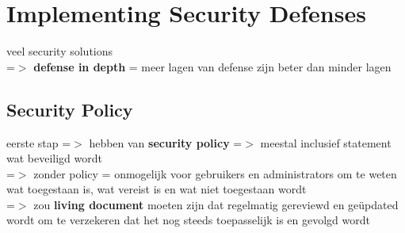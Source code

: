 \documentclass{report}
\begin{document}
\section{Implementing Security Defenses}
veel security solutions
\\ =$>$ \textbf{defense in depth} = meer lagen van defense zijn beter dan minder lagen
\subsection{Security Policy}
eerste stap =$>$ hebben van \textbf{security policy} =$>$ meestal inclusief statement wat beveiligd wordt
\\=$>$ zonder policy = onmogelijk voor gebruikers en administrators om te weten wat toegestaan is, wat vereist is en wat niet toegestaan wordt
\\=$>$ zou \textbf{living document} moeten zijn dat regelmatig gereviewd en ge\"updated wordt om te verzekeren dat het nog steeds toepasselijk is en gevolgd wordt
\end{document}
